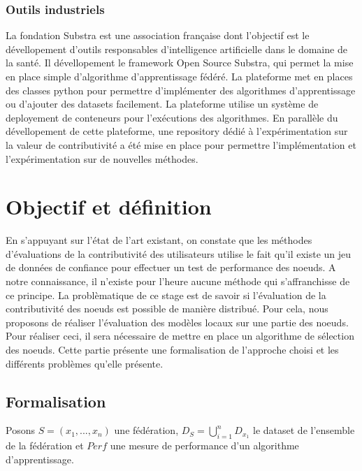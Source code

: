 \documentclass[stage3a]{tnreport} %
\begin{document}
\subsubsection{Outils industriels} \label{substra}


La fondation Substra est une association française dont l'objectif est le dévellopement d'outils responsables d'intelligence artificielle dans le domaine de la santé. Il dévellopement le framework Open Source Substra, qui permet la mise en place simple d'algorithme d'apprentissage fédéré. La plateforme met en places des classes python pour permettre d'implémenter des algorithmes d'apprentissage ou d'ajouter des datasets facilement. La plateforme utilise un système de deployement de conteneurs pour l'exécutions des algorithmes. En parallèle du dévellopement de cette plateforme, une repository dédié à l'expérimentation sur la valeur de contributivité a été mise en place pour permettre l'implémentation et l'expérimentation sur de nouvelles méthodes.



\cleardoublepage

\section{Objectif et définition}

En s'appuyant sur l'état de l'art existant, on constate que les méthodes d'évaluations de la contributivité des utilisateurs utilise le fait qu'il existe un jeu de données de confiance pour effectuer un test de performance des noeuds. A notre connaissance, il n'existe pour l'heure aucune méthode qui s'affranchisse de ce principe. La problèmatique de ce stage est de savoir si l'évaluation de la contributivité des noeuds est possible de manière distribué. Pour cela, nous proposons de réaliser l'évaluation des modèles locaux sur une partie des noeuds. Pour réaliser ceci, il sera nécessaire de mettre en place un algorithme de sélection des noeuds. Cette partie présente une formalisation de l'approche choisi et les différents problèmes qu'elle présente.

\subsection{Formalisation}

Posons $S=(x_1,...,x_n)$ une fédération, $D_S = \bigcup_{i=1}^n D_{x_1}$ le dataset de l'ensemble de la fédération et $Perf$ une mesure de performance d'un algorithme d'apprentissage. 
\end{document}
